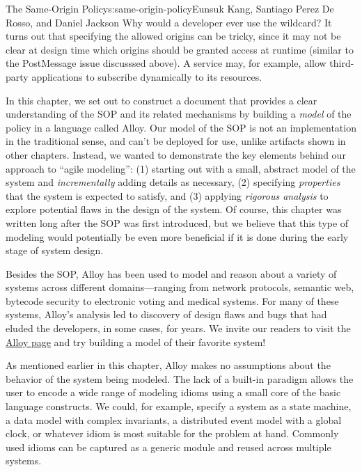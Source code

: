 \begin{aosachapter}{The Same-Origin Policy}{s:same-origin-policy}{Eunsuk Kang, Santiago Perez De Rosso, and Daniel Jackson}
Why would a developer ever use the wildcard? It turns out that
specifying the allowed origins can be tricky, since it may not be clear
at design time which origins should be granted access at runtime
(similar to the PostMessage issue discusssed above). A service may, for
example, allow third-party applications to subscribe dynamically to its
resources.

\label{conclusion}

In this chapter, we set out to construct a document that provides a
clear understanding of the SOP and its related mechanisms by building a
\emph{model} of the policy in a language called Alloy. Our model of the
SOP is not an implementation in the traditional sense, and can't be
deployed for use, unlike artifacts shown in other chapters. Instead, we
wanted to demonstrate the key elements behind our approach to ``agile
modeling'': (1) starting out with a small, abstract model of the system
and \emph{incrementally} adding details as necessary, (2) specifying
\emph{properties} that the system is expected to satisfy, and (3)
applying \emph{rigorous analysis} to explore potential flaws in the
design of the system. Of course, this chapter was written long after the
SOP was first introduced, but we believe that this type of modeling
would potentially be even more beneficial if it is done during the early
stage of system design.

Besides the SOP, Alloy has been used to model and reason about a variety
of systems across different domains---ranging from network protocols,
semantic web, bytecode security to electronic voting and medical
systems. For many of these systems, Alloy's analysis led to discovery of
design flaws and bugs that had eluded the developers, in some cases, for
years. We invite our readers to visit the
\href{http://alloy.mit.edu}{Alloy page} and try building a model of
their favorite system!

\label{appendix-reusing-modules-in-alloy}

\label{500l.sop.appendix} As mentioned earlier in this chapter, Alloy
makes no assumptions about the behavior of the system being modeled. The
lack of a built-in paradigm allows the user to encode a wide range of
modeling idioms using a small core of the basic language constructs. We
could, for example, specify a system as a state machine, a data model
with complex invariants, a distributed event model with a global clock,
or whatever idiom is most suitable for the problem at hand. Commonly
used idioms can be captured as a generic module and reused across
multiple systems.


\end{aosachapter}
